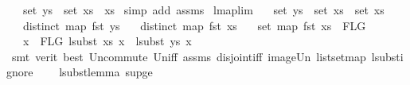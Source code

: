 \begin{isabellebody}
\ \ \ {\isachardoublequoteopen}set\ ys\ {\isacharequal}{\kern0pt}\ set\ {\isacharparenleft}{\kern0pt}xs{}\ {\isacharat}{\kern0pt}\ xs{}{\isacharparenright}{\kern0pt}{\isachardoublequoteclose}\isanewline
%
\isadelimproof
%
\endisadelimproof
%
\isatagproof
{}\isamarkupfalse%
\ {\isacharparenleft}{\kern0pt}simp\ add{\isacharcolon}{\kern0pt}\ assms{\isacharparenright}{\kern0pt}%
\endisatagproof
{\isafoldproof}%
%
\isadelimproof
\isanewline
%
\endisadelimproof
\isanewline
\isanewline
{}\isamarkupfalse%
\ lmap{\isacharunderscore}{\kern0pt}lim{}{\isacharcolon}{\kern0pt}\isanewline
\ \ \ {\isachardoublequoteopen}set\ ys\ {\isacharequal}{\kern0pt}\ set\ xs{}\ {\isasymunion}\ set\ xs{}{\isachardoublequoteclose}\isanewline
\ \ \ {\isachardoublequoteopen}distinct\ {\isacharparenleft}{\kern0pt}map\ fst\ ys{\isacharparenright}{\kern0pt}{\isachardoublequoteclose}\isanewline
\ \ \ {\isachardoublequoteopen}distinct\ {\isacharparenleft}{\kern0pt}map\ fst\ xs{}{\isacharparenright}{\kern0pt}{\isachardoublequoteclose}\isanewline
\ \ \ {\isachardoublequoteopen}set\ {\isacharparenleft}{\kern0pt}map\ fst\ xs{}{\isacharparenright}{\kern0pt}\ {\isasyminter}\ FLG\ {\isacharequal}{\kern0pt}\ {\isacharbraceleft}{\kern0pt}{\isacharbraceright}{\kern0pt}{\isachardoublequoteclose}\isanewline
\ \ \ {\isachardoublequoteopen}{\isasymforall}x\ {\isasymin}\ FLG{\isachardot}{\kern0pt}\ lsubst\ xs{}\ x\ {\isacharequal}{\kern0pt}\ lsubst\ ys\ x{\isachardoublequoteclose}\isanewline
%
\isadelimproof
%
\endisadelimproof
%
\isatagproof
{}\isamarkupfalse%
\ {\isacharparenleft}{\kern0pt}smt\ {\isacharparenleft}{\kern0pt}verit{\isacharcomma}{\kern0pt}\ best{\isacharparenright}{\kern0pt}\ Un{\isacharunderscore}{\kern0pt}commute\ Un{\isacharunderscore}{\kern0pt}iff\ assms{\isacharparenleft}{\kern0pt}{}{\isacharcomma}{\kern0pt}{}{\isacharcomma}{\kern0pt}{}{\isacharcomma}{\kern0pt}{}{\isacharparenright}{\kern0pt}\ disjoint{\isacharunderscore}{\kern0pt}iff\ image{\isacharunderscore}{\kern0pt}Un\ list{\isachardot}{\kern0pt}set{\isacharunderscore}{\kern0pt}map\ lsubst{\isacharunderscore}{\kern0pt}ignore\isanewline
\ \ \ \ lsubst{\isacharunderscore}{\kern0pt}lemma{}\ sup{\isacharunderscore}{\kern0pt}ge{}{\isacharparenright}{\kern0pt}%
\endisatagproof
{\isafoldproof}%

\end{isabellebody}
